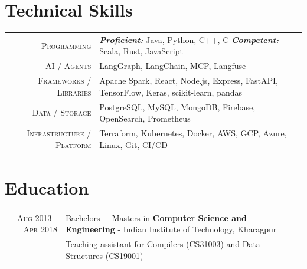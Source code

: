 \documentclass[a4paper,10pt]{extarticle}
\begin{document}

\vspace{0.1cm}
\section{{Technical Skills}}
\vspace{2pt}
\begin{tabular}{r|p{15cm}}
\textsc{Programming} & \textit{\textbf{Proficient:}} \small{Java, Python, C++, C} \quad \textit{\textbf{Competent:}} \small{Scala, Rust, JavaScript} \\
\textsc{AI / Agents} & \small{LangGraph, LangChain, MCP, Langfuse}\\
\textsc{Frameworks / Libraries} & \small{Apache Spark, React, Node.js, Express, FastAPI, TensorFlow, Keras, scikit-learn, pandas}\\
\textsc{Data / Storage} & \small{PostgreSQL, MySQL, MongoDB, Firebase, OpenSearch, Prometheus}\\
\textsc{Infrastructure / Platform} & \small{Terraform, Kubernetes, Docker, AWS, GCP, Azure, Linux, Git, CI/CD}\\
\end{tabular}

\vspace{0cm}
\section{Education}
\vspace{2pt}
\begin{tabular}{r|p{17.5cm}}
\textsc{Aug 2013 - Apr 2018} & Bachelors + Masters in \textbf{Computer Science and Engineering} - Indian Institute of Technology, Kharagpur\\
\textsc & Teaching assistant for Compilers (CS31003) and Data Structures (CS19001)\\
\end{tabular}
\end{document}
